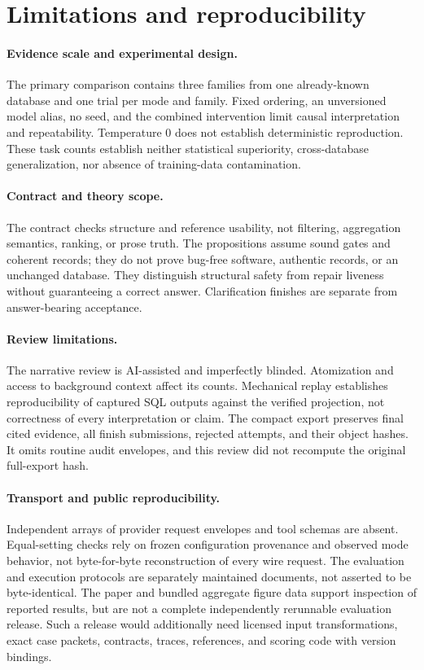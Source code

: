 \documentclass{article}
\begin{document}
\section{Limitations and reproducibility}
\label{sec:limitations}
\paragraph{Evidence scale and experimental design.} The primary comparison contains three families from one already-known database and one trial per mode and family. Fixed ordering, an unversioned model alias, no seed, and the combined intervention limit causal interpretation and repeatability. Temperature 0 does not establish deterministic reproduction. These task counts establish neither statistical superiority, cross-database generalization, nor absence of training-data contamination.

\paragraph{Contract and theory scope.} The contract checks structure and reference usability, not filtering, aggregation semantics, ranking, or prose truth. The propositions assume sound gates and coherent records; they do not prove bug-free software, authentic records, or an unchanged database. They distinguish structural safety from repair liveness without guaranteeing a correct answer. Clarification finishes are separate from answer-bearing acceptance.

\paragraph{Review limitations.} The narrative review is AI-assisted and imperfectly blinded. Atomization and access to background context affect its counts. Mechanical replay establishes reproducibility of captured SQL outputs against the verified projection, not correctness of every interpretation or claim. The compact export preserves final cited evidence, all finish submissions, rejected attempts, and their object hashes. It omits routine audit envelopes, and this review did not recompute the original full-export hash.

\paragraph{Transport and public reproducibility.} Independent arrays of provider request envelopes and tool schemas are absent. Equal-setting checks rely on frozen configuration provenance and observed mode behavior, not byte-for-byte reconstruction of every wire request. The evaluation and execution protocols are separately maintained documents, not asserted to be byte-identical. The paper and bundled aggregate figure data support inspection of reported results, but are not a complete independently rerunnable evaluation release. Such a release would additionally need licensed input transformations, exact case packets, contracts, traces, references, and scoring code with version bindings.
\end{document}
